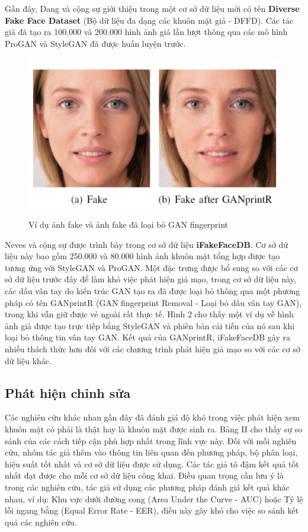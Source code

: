 \documentclass{article}
\begin{document}
Gần đây, Dang và cộng sự giới thiệu trong  một cơ sở dữ liệu mới có tên \textbf{Diverse Fake Face Dataset} (Bộ dữ liệu đa dạng các khuôn mặt giả - DFFD). Các tác giả đã tạo ra 100.000 và 200.000 hình ảnh giả lần lượt thông qua các mô hình ProGAN và StyleGAN đã được huấn luyện trước.

\begin{figure}[h!]
\caption{Ví dụ ảnh fake và ảnh fake đã loại bỏ GAN fingerprint}
\includegraphics[width=\columnwidth]{fig-2-example}
\label{fig-2-example}
\end{figure}

Neves và cộng sự được trình bày trong  cơ sở dữ liệu \textbf{iFakeFaceDB}. Cơ sở dữ liệu này bao gồm 250.000 và 80.000 hình ảnh khuôn mặt tổng hợp được tạo tương ứng với StyleGAN và ProGAN. Một đặc trưng được bổ sung so với các cơ sở dữ liệu trước đây để làm khó việc phát hiện giả mạo, trong cơ sở dữ liệu này, các dấu vân tay do kiến trúc GAN tạo ra đã được loại bỏ thông qua một phương pháp có tên GANprintR (GAN fingerprint Removal - Loại bỏ dấu vân tay GAN), trong khi vẫn giữ được vẻ ngoài rất thực tế. Hình 2 cho thấy một ví dụ về hình ảnh giả được tạo trực tiếp bằng StyleGAN và phiên bản cải tiến của nó sau khi loại bỏ thông tin vân tay GAN. Kết quả của GANprintR, iFakeFaceDB gây ra nhiều thách thức hơn đối với các chương trình phát hiện giả mạo so với các cơ sở dữ liệu khác.

\subsection{Phát hiện chỉnh sửa}

Các nghiên cứu khác nhau gần đây đã đánh giá độ khó trong việc phát hiện xem khuôn mặt có phải là thật hay là khuôn mặt được sinh ra. Bảng II cho thấy sự so sánh của các cách tiếp cận phù hợp nhất trong lĩnh vực này. Đối với mỗi nghiên cứu, nhóm tác giả thêm vào thông tin liên quan đến phương pháp, bộ phân loại, hiệu suất tốt nhất và cơ sở dữ liệu được sử dụng. Các tác giả tô đậm kết quả tốt nhất đạt được cho mỗi cơ sở dữ liệu công khai. Điều quan trọng cần lưu ý là trong các nghiên cứu, tác giả sử dụng các phương pháp đánh giá kết quả khác nhau, ví dụ: Khu vực dưới đường cong (Area Under the Curve - AUC) hoặc Tỷ lệ lỗi ngang bằng (Equal Error Rate - EER), điều này gây khó cho việc so sánh kết quả các nghiên cứu.
\end{document}
